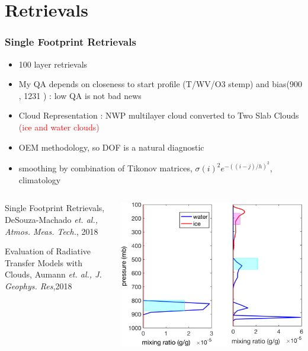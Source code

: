 \documentclass[10pt,t]{beamer}
\begin{document}
\section{Retrievals}
\begin{frame}
  \frametitle{Single Footprint Retrievals}
  \begin{itemize}
  \item 100 layer retrievals
  \item My QA depends on closeness to start profile (T/WV/O3 stemp)
    and bias(900 \wn, 1231 \wn) : low QA is not bad news
  \item Cloud Representation : NWP multilayer cloud converted to Two Slab
    Clouds \textcolor{red}{(ice and water clouds)}
  \item OEM methodology, so DOF is a natural diagnostic
  \item smoothing by combination of Tikonov matrices,
    $\sigma(i)^2 e^{-((i-j)/h)^2}$, climatology
  \end{itemize}

  \begin{columns}[T] %
    \begin{column}{.38\textwidth}

      \small

      Single Footprint Retrievals, DeSouza-Machado {\em et. al., Atmos. Meas. Tech.}, 2018 \newline

      Evaluation of Radiative Transfer Models with Clouds, Aumann {\em et. al., J. Geophys. Res},2018

    \end{column}%
    \hfill%
    \begin{column}{.58\textwidth}

      \centering
      \includegraphics[width=0.75\linewidth]{Figs/FigsRetr/clouds_profileG040_271_321_lls.png}
    \end{column}%
  \end{columns}

\end{frame}
\end{document}
